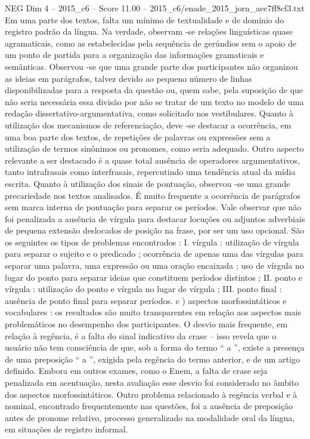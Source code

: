 \begin{textsample}{NEG Dim 4 – 2015\_c6 – Score 11.00 – 2015\_c6/enade\_2015\_jorn\_aec7ff8cf3.txt}
Em uma parte dos textos, falta um mínimo de textualidade e de domínio do registro padrão da língua.
Na verdade, observam -se relações linguísticas quase agramaticais, como as estabelecidas pela sequência de gerúndios sem o apoio de um ponto de partida para a organização das informações gramaticais e semânticas.
Observou -se que uma grande parte dos participantes não organizou as ideias em parágrafos, talvez devido ao pequeno número de linhas disponibilizadas para a resposta da questão ou, quem sabe, pela suposição de que não seria necessária essa divisão por não se tratar de um texto no modelo de uma redação dissertativo-argumentativa, como solicitado nos vestibulares.
Quanto à utilização dos mecanismos de referenciação, deve -se destacar a ocorrência, em uma boa parte dos textos, de repetições de palavras ou expressões sem a utilização de termos sinônimos ou pronomes, como seria adequado.
Outro aspecto relevante a ser destacado é a quase total ausência de operadores argumentativos, tanto intrafrasais como interfrasais, repercutindo uma tendência atual da mídia escrita.
Quanto à utilização dos sinais de pontuação, observou -se uma grande precariedade nos textos analisados.
É muito frequente a ocorrência de parágrafos sem marca interna de pontuação para separar os períodos.
Vale observar que não foi penalizada a ausência de vírgula para destacar locuções ou adjuntos adverbiais de pequena extensão deslocados de posição na frase, por ser um uso opcional.
São os seguintes os tipos de problemas encontrados : I. vírgula : utilização de vírgula para separar o sujeito e o predicado ; ocorrência de apenas uma das vírgulas para separar uma palavra, uma expressão ou uma oração encaixada ; uso de vírgula no lugar do ponto para separar ideias que constituem períodos distintos ; II. ponto e vírgula : utilização do ponto e vírgula no lugar de vírgula ; III. ponto final : ausência de ponto final para separar períodos. c ) aspectos morfossintáticos e vocabulares : os resultados são muito transparentes em relação aos aspectos mais problemáticos no desempenho dos participantes.
O desvio mais frequente, em relação à regência, é a falta do sinal indicativo da crase – isso revela que o usuário não tem consciência de que, sob a forma do termo “ a ”, existe a presença de uma preposição “ a ”, exigida pela regência do termo anterior, e de um artigo definido.
Embora em outros exames, como o Enem, a falta de crase seja penalizada em acentuação, nesta avaliação esse desvio foi considerado no âmbito dos aspectos morfossintáticos.
Outro problema relacionado à regência verbal e à nominal, encontrado frequentemente nas questões, foi a ausência de preposição antes de pronome relativo, processo generalizado na modalidade oral da língua, em situações de registro informal.

\end{textsample}
